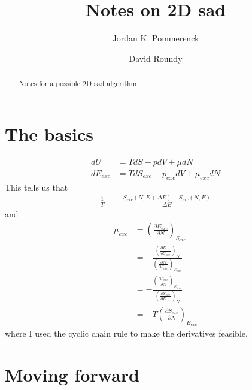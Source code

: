 \documentclass[letterpaper,twocolumn,amsmath,amssymb,pre,aps,10pt]{revtex4-1}
\begin{document}
\title{Notes on 2D sad
}

\author{Jordan K. Pommerenck} \author{David Roundy}

\begin{abstract}
  Notes for a possible 2D sad algorithm
\end{abstract}

\maketitle

\section{The basics}

\begin{align}
  dU &= TdS - pdV + \mu dN \\
  dE_{exc} &= TdS_{exc} - p_{exc}dV + \mu_{exc} dN
\end{align}
This tells us that
\begin{align}
  \frac{1}{T} &= \frac{S_{exc}(N,E+\Delta E) - S_{exc}(N,E)}{\Delta E}
\end{align}
and
\begin{align}
  \mu_{exc} &= \left(\frac{\partial E_{exc}}{\partial N}\right)_{S_{exc}}
  \\
  &= -\frac{
    \left(\frac{\partial E_{exc}}{\partial S_{exc}}\right)_{N}
  }{
    \left(\frac{\partial N}{\partial S_{exc}}\right)_{E_{exc}}
  }
  \\
  &= -\frac{
    \left(\frac{\partial S_{exc}}{\partial N}\right)_{E_{exc}}
  }{
    \left(\frac{\partial S_{exc}}{\partial E_{exc}}\right)_{N}
  }
  \\
  &= -T\left(\frac{\partial S_{exc}}{\partial N}\right)_{E_{exc}}
\end{align}
where I used the cyclic chain rule to make the derivatives feasible.

\section{Moving forward}
\end{document}
